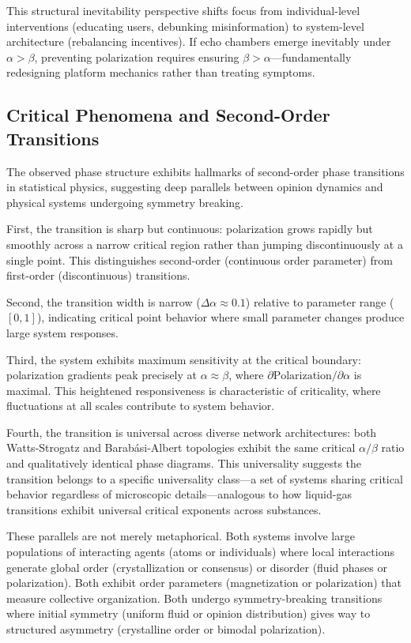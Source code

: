 \documentclass[11pt,a4paper]{article}
\begin{document}
This structural inevitability perspective shifts focus from individual-level interventions (educating users, debunking misinformation) to system-level architecture (rebalancing incentives). If echo chambers emerge inevitably under $\alpha > \beta$, preventing polarization requires ensuring $\beta > \alpha$—fundamentally redesigning platform mechanics rather than treating symptoms.

\subsection{Critical Phenomena and Second-Order Transitions}

The observed phase structure exhibits hallmarks of second-order phase transitions in statistical physics, suggesting deep parallels between opinion dynamics and physical systems undergoing symmetry breaking.

First, the transition is sharp but continuous: polarization grows rapidly but smoothly across a narrow critical region rather than jumping discontinuously at a single point. This distinguishes second-order (continuous order parameter) from first-order (discontinuous) transitions.

Second, the transition width is narrow ($\Delta\alpha \approx 0.1$) relative to parameter range ($[0, 1]$), indicating critical point behavior where small parameter changes produce large system responses.

Third, the system exhibits maximum sensitivity at the critical boundary: polarization gradients peak precisely at $\alpha \approx \beta$, where $\partial \text{Polarization}/\partial\alpha$ is maximal. This heightened responsiveness is characteristic of criticality, where fluctuations at all scales contribute to system behavior.

Fourth, the transition is universal across diverse network architectures: both Watts-Strogatz and Barabási-Albert topologies exhibit the same critical $\alpha/\beta$ ratio and qualitatively identical phase diagrams. This universality suggests the transition belongs to a specific universality class—a set of systems sharing critical behavior regardless of microscopic details—analogous to how liquid-gas transitions exhibit universal critical exponents across substances.

These parallels are not merely metaphorical. Both systems involve large populations of interacting agents (atoms or individuals) where local interactions generate global order (crystallization or consensus) or disorder (fluid phases or polarization). Both exhibit order parameters (magnetization or polarization) that measure collective organization. Both undergo symmetry-breaking transitions where initial symmetry (uniform fluid or opinion distribution) gives way to structured asymmetry (crystalline order or bimodal polarization).
\end{document}
